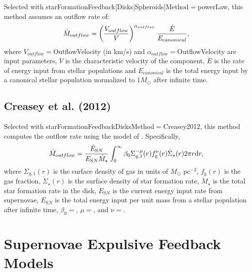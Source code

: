 Selected with {\normalfont \ttfamily starFormationFeedback[Disks|Spheroids]Method}$=${\normalfont \ttfamily powerLaw}, this method assumes an outflow rate of:
\begin{equation}
 \dot{M}_{\mathrm outflow} = \left({V_{\mathrm outflow} \over V}\right)^{\alpha_{\mathrm outflow}} {\dot{E} \over E_{\mathrm canonical}},
\end{equation}
where $V_{\mathrm outflow}=${\normalfont {}OutflowVelocity} (in km/s) and $\alpha_{\mathrm outflow}=${\normalfont {}OutflowVelocity} are input parameters, $V$ is the characteristic velocity of the component, $\dot{E}$ is the rate of energy input from stellar populations and $E_{\mathrm canonical}$ is the total energy input by a canonical stellar population normalized to $1 M_\odot$ after infinite time.

\subsection{Creasey et al. (2012)}

Selected with {\normalfont \ttfamily starFormationFeedbackDisksMethod}$=${\normalfont \ttfamily Creasey2012}, this method computes the outflow rate using the model of \cite{creasey_how_2012}. Specifically,
\begin{equation}
\dot{M}_{\mathrm outflow} = {\dot{E}_{\mathrm SN} \over E_{\mathrm SN} \dot{M}_\star} \int_0^\infty \beta_0 \Sigma_{g,1}^{-\mu}(r) f_{\mathrm g}^\nu(r) \dot{\Sigma}_\star(r) 2 \pi r {\mathrm d}r,
\end{equation}
where $\Sigma_{g,1}(r)$ is the surface density of gas in units of $M_\odot$ pc$^{-2}$, $f_{\mathrm g}(r)$ is the gas fraction, $\dot{\Sigma}_\star(r)$ is the surface density of star formation rate, $\dot{M}_\star$ is the total star formation rate in the disk, $\dot{E}_{\mathrm SN}$ is the current energy input rate from supernovae, $E_{\mathrm SN}$ is the total energy input per unit mass from a stellar population after infinite time, $\beta_0=${\normalfont {}}, $\mu=${\normalfont \ttfamily [starFormationFeedbackDisksCreasy2012Mu]}, and $\nu=${\normalfont \ttfamily [starFormationFeedbackDisksCreasy2012Nu]}.

\section{Supernovae Expulsive Feedback Models}\label{sec:sneExpulsiveFeedback}

